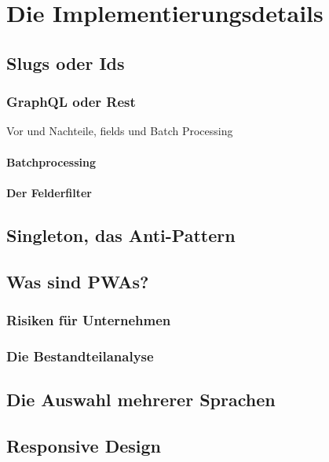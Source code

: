 \chapter{Die Implementierungsdetails}
\label{chap:abkuerzungsverzeichnis}

\section{Slugs oder Ids}

\subsection{GraphQL oder Rest}
Vor und Nachteile, fields und Batch Processing

\subsubsection{Batchprocessing}

\subsubsection{Der Felderfilter}

\section{Singleton, das Anti-Pattern}
\section{Was sind PWAs?}

\subsection{Risiken für Unternehmen}

\subsection{Die Bestandteilanalyse}

\section{Die Auswahl mehrerer Sprachen}

\section{Responsive Design}

